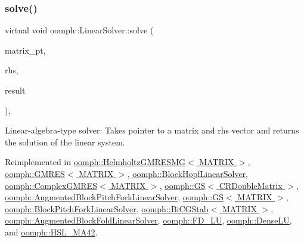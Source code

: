 \subsubsection{\texorpdfstring{solve()}{solve()}\hspace{0.1cm}{\footnotesize\ttfamily [3/3]}}
{\footnotesize\ttfamily virtual void oomph\+::\+Linear\+Solver\+::solve (\begin{DoxyParamCaption}\item[{\hyperlink{classoomph_1_1DoubleMatrixBase}{Double\+Matrix\+Base} $\ast$const \&}]{matrix\+\_\+pt,  }\item[{const \hyperlink{classoomph_1_1Vector}{Vector}$<$ double $>$ \&}]{rhs,  }\item[{\hyperlink{classoomph_1_1Vector}{Vector}$<$ double $>$ \&}]{result }\end{DoxyParamCaption})\hspace{0.3cm}{\ttfamily [inline]}, {\ttfamily [virtual]}}



Linear-\/algebra-\/type solver\+: Takes pointer to a matrix and rhs vector and returns the solution of the linear system. 



Reimplemented in \hyperlink{classoomph_1_1HelmholtzGMRESMG_a14ba0370fbc782fa7ab9364a035a7513}{oomph\+::\+Helmholtz\+G\+M\+R\+E\+S\+M\+G$<$ M\+A\+T\+R\+I\+X $>$}, \hyperlink{classoomph_1_1GMRES_ab2d5a5beea3383391404a62515a210d9}{oomph\+::\+G\+M\+R\+E\+S$<$ M\+A\+T\+R\+I\+X $>$}, \hyperlink{classoomph_1_1BlockHopfLinearSolver_a5074e6a65910bcbe881a3e1c71b1947f}{oomph\+::\+Block\+Hopf\+Linear\+Solver}, \hyperlink{classoomph_1_1ComplexGMRES_a9dd1695e8d907d57151df79a6e3e3968}{oomph\+::\+Complex\+G\+M\+R\+E\+S$<$ M\+A\+T\+R\+I\+X $>$}, \hyperlink{classoomph_1_1GS_3_01CRDoubleMatrix_01_4_a989f4c09b2976a561acb498ba4d85ace}{oomph\+::\+G\+S$<$ C\+R\+Double\+Matrix $>$}, \hyperlink{classoomph_1_1AugmentedBlockPitchForkLinearSolver_a8569368b8772d6642a50fb1279f4b61f}{oomph\+::\+Augmented\+Block\+Pitch\+Fork\+Linear\+Solver}, \hyperlink{classoomph_1_1GS_a7fb932f50b127b44208c0dee295e6bd8}{oomph\+::\+G\+S$<$ M\+A\+T\+R\+I\+X $>$}, \hyperlink{classoomph_1_1BlockPitchForkLinearSolver_a45c8a56bd1942374756feb9edcfb6151}{oomph\+::\+Block\+Pitch\+Fork\+Linear\+Solver}, \hyperlink{classoomph_1_1BiCGStab_a994915fcd5d99a58472559fdb57807c4}{oomph\+::\+Bi\+C\+G\+Stab$<$ M\+A\+T\+R\+I\+X $>$}, \hyperlink{classoomph_1_1AugmentedBlockFoldLinearSolver_ae7f5f1459fef68479b39f0d1a1dce243}{oomph\+::\+Augmented\+Block\+Fold\+Linear\+Solver}, \hyperlink{classoomph_1_1FD__LU_a2a44542b29faa39f1b816dc80da9eba1}{oomph\+::\+F\+D\+\_\+\+LU}, \hyperlink{classoomph_1_1DenseLU_a1d79cf13a269733d655e3e90c447f84d}{oomph\+::\+Dense\+LU}, and \hyperlink{classoomph_1_1HSL__MA42_ad8f7434a5b1391751ac513c7dc1acc77}{oomph\+::\+H\+S\+L\+\_\+\+M\+A42}.



